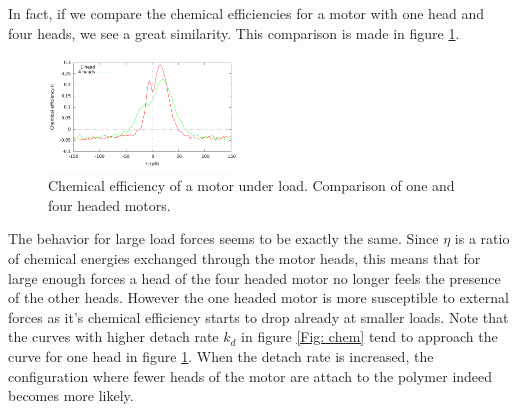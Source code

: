 \documentclass[aps,pre,twocolumn,showpacs,showkeys,a4paper]{revtex4}
\begin{document}
In fact, if we compare the chemical efficiencies for a motor with one head and four heads, we see a great similarity.
This comparison is made in figure \ref{Fig: chem_eff_1head}.
\begin{figure}[t]
\centering
\includegraphics[width=0.45\textwidth,height=!]{chemical_cycle_1head}
\caption{Chemical efficiency of a motor under load. Comparison of one and four headed motors.}
\label{Fig: chem_eff_1head}
\end{figure}
The behavior for large load forces seems to be exactly the same.
Since $\eta$ is a ratio of chemical energies exchanged through the motor heads, this means that for large enough forces a head of the four headed motor no longer feels the presence of the other heads.
However the one headed motor is more susceptible to external forces as it's chemical efficiency starts to drop already at smaller loads. 
Note that the curves with higher detach rate $k_d$ in figure \ref{Fig: chem} tend to approach the curve for one head in figure \ref{Fig: chem_eff_1head}. 
When the detach rate is increased, the configuration where fewer heads of the motor are attach to the polymer indeed becomes more likely.
\end{document}
